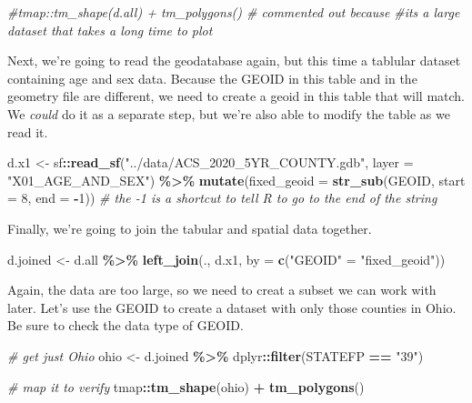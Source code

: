\documentclass[]{article}
\newenvironment{Shaded}{\begin{snugshade}}{\end{snugshade}}
\newcommand{\AttributeTok}[1]{\textcolor[rgb]{0.13,0.29,0.53}{#1}}
\newcommand{\CommentTok}[1]{\textcolor[rgb]{0.56,0.35,0.01}{\textit{#1}}}
\newcommand{\DecValTok}[1]{\textcolor[rgb]{0.00,0.00,0.81}{#1}}
\newcommand{\FunctionTok}[1]{\textcolor[rgb]{0.13,0.29,0.53}{\textbf{#1}}}
\newcommand{\NormalTok}[1]{#1}
\newcommand{\OtherTok}[1]{\textcolor[rgb]{0.56,0.35,0.01}{#1}}
\newcommand{\SpecialCharTok}[1]{\textcolor[rgb]{0.81,0.36,0.00}{\textbf{#1}}}
\newcommand{\StringTok}[1]{\textcolor[rgb]{0.31,0.60,0.02}{#1}}
\begin{document}
\begin{Shaded}
\begin{Highlighting}[]
\CommentTok{\#tmap::tm\_shape(d.all) + tm\_polygons() \# commented out because }
\CommentTok{\#it\textquotesingle{}s a large dataset that takes a long time to plot}
\end{Highlighting}
\end{Shaded}

Next, we're going to read the geodatabase again, but this time a
tablular dataset containing age and sex data. Because the GEOID in this
table and in the geometry file are different, we need to create a geoid
in this table that will match. We \emph{could} do it as a separate step,
but we're also able to modify the table as we read it.

\begin{Shaded}
\begin{Highlighting}[]
\NormalTok{d.x1 }\OtherTok{\textless{}{-}}\NormalTok{ sf}\SpecialCharTok{::}\FunctionTok{read\_sf}\NormalTok{(}\StringTok{"../data/ACS\_2020\_5YR\_COUNTY.gdb"}\NormalTok{, }\AttributeTok{layer =} \StringTok{"X01\_AGE\_AND\_SEX"}\NormalTok{) }\SpecialCharTok{\%\textgreater{}\%}
  \FunctionTok{mutate}\NormalTok{(}\AttributeTok{fixed\_geoid =} \FunctionTok{str\_sub}\NormalTok{(GEOID, }\AttributeTok{start =} \DecValTok{8}\NormalTok{, }\AttributeTok{end =} \SpecialCharTok{{-}}\DecValTok{1}\NormalTok{)) }
\CommentTok{\# the {-}1 is a shortcut to tell R to go to the end of the string}
\end{Highlighting}
\end{Shaded}

Finally, we're going to join the tabular and spatial data together.

\begin{Shaded}
\begin{Highlighting}[]
\NormalTok{d.joined }\OtherTok{\textless{}{-}}\NormalTok{ d.all }\SpecialCharTok{\%\textgreater{}\%} \FunctionTok{left\_join}\NormalTok{(., d.x1, }\AttributeTok{by =} \FunctionTok{c}\NormalTok{(}\StringTok{"GEOID"} \OtherTok{=} \StringTok{"fixed\_geoid"}\NormalTok{))}
\end{Highlighting}
\end{Shaded}

Again, the data are too large, so we need to creat a subset we can work
with later. Let's use the GEOID to create a dataset with only those
counties in Ohio. Be sure to check the data type of GEOID.

\begin{Shaded}
\begin{Highlighting}[]
\CommentTok{\# get just Ohio}
\NormalTok{ohio }\OtherTok{\textless{}{-}}\NormalTok{ d.joined }\SpecialCharTok{\%\textgreater{}\%}\NormalTok{ dplyr}\SpecialCharTok{::}\FunctionTok{filter}\NormalTok{(STATEFP }\SpecialCharTok{==} \StringTok{"39"}\NormalTok{)}


\CommentTok{\# map it to verify}
\NormalTok{tmap}\SpecialCharTok{::}\FunctionTok{tm\_shape}\NormalTok{(ohio) }\SpecialCharTok{+} \FunctionTok{tm\_polygons}\NormalTok{()}
\end{Highlighting}
\end{Shaded}
\end{document}
